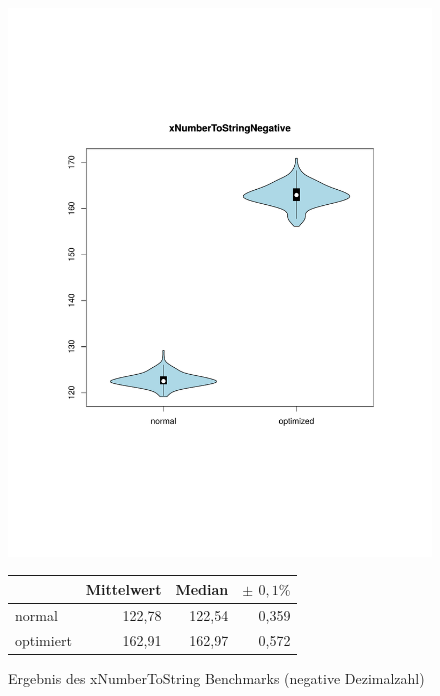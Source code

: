\begin{figure}[H]
{		\includegraphics[trim=20mm 60mm 0mm 50mm,scale=0.50]{pictures/vioplot_xNumberToStringNegative.pdf}
	}
	\begin{table}[H]
	\centering
		\begin{tabular}{|l|r|r|r|}
			\hline
		   		 	  & Mittelwert & Median & \bf{$\pm$ $0,1\%$} \\
		 	\hline
		 	\hline
		  	normal 	  & 122,78 & 122,54 & 0,359 \\
		 	optimiert & 162,91 & 162,97 & 0,572 \\ 
		  	\hline
		  	
		\end{tabular}
	\end{table}

	\caption{Ergebnis des xNumberToString Benchmarks (negative Dezimalzahl)}\label{bp:instURIBench}
\end{figure}


